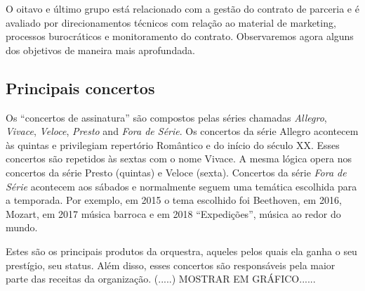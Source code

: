 \documentclass[a4paper, 12pt, openright, oneside, german, french, english, brazil]{abntex2}
\begin{document}
	
	O oitavo e último grupo está relacionado com a gestão do contrato de parceria e é avaliado por direcionamentos técnicos com relação ao material de marketing, processos burocráticos e monitoramento do contrato. Observaremos agora alguns dos objetivos de maneira mais aprofundada.
	
	\subsection{Principais concertos}
	
	
	Os ``concertos de assinatura'' são compostos pelas séries chamadas \textit{Allegro}, \textit{Vivace}, \textit{Veloce}, \textit{Presto} and \textit{Fora de Série}. Os concertos da série Allegro acontecem às quintas e privilegiam repertório Romântico e do início do século XX. Esses concertos são repetidos às sextas com o nome Vivace. A mesma lógica opera nos concertos da série Presto (quintas) e Veloce (sexta). Concertos da série \textit{Fora de Série} acontecem aos sábados e normalmente seguem uma temática escolhida para a temporada. Por exemplo, em 2015 o tema escolhido foi Beethoven, em 2016, Mozart, em 2017 música barroca e em 2018 ``Expedições'', música ao redor do mundo.
	
	
	Estes são os principais produtos da orquestra, aqueles pelos quais ela ganha o seu prestígio, seu status. Além disso, esses concertos são responsáveis pela maior parte das receitas da organização. (.....)  MOSTRAR EM GRÁFICO......
	
\end{document}
